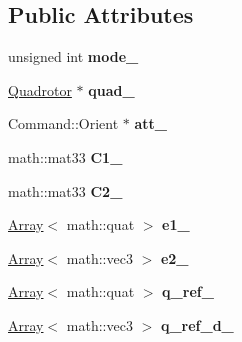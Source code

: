 \subsection*{Public Attributes}
\begin{DoxyCompactItemize}
\item 
\hypertarget{classAttitude_a0f341afa94379e3eb7619782d33e2690}{
unsigned int {\bfseries mode\_\-}}
\label{classAttitude_a0f341afa94379e3eb7619782d33e2690}

\item 
\hypertarget{classAttitude_a46e4a1fd13d48a7811ca925f8a33d7a3}{
\hyperlink{classQuadrotor}{Quadrotor} $\ast$ {\bfseries quad\_\-}}
\label{classAttitude_a46e4a1fd13d48a7811ca925f8a33d7a3}

\item 
\hypertarget{classAttitude_a902c2fc6c510aa1eca73c812854a4531}{
Command::Orient $\ast$ {\bfseries att\_\-}}
\label{classAttitude_a902c2fc6c510aa1eca73c812854a4531}

\item 
\hypertarget{classAttitude_a4551548f9b888cbc3f4a41d102fea01f}{
math::mat33 {\bfseries C1\_\-}}
\label{classAttitude_a4551548f9b888cbc3f4a41d102fea01f}

\item 
\hypertarget{classAttitude_a6e00c25cca6bf99d4828c96e22dd0f85}{
math::mat33 {\bfseries C2\_\-}}
\label{classAttitude_a6e00c25cca6bf99d4828c96e22dd0f85}

\item 
\hypertarget{classAttitude_a8117974c86248890c7c7ab6db5c73966}{
\hyperlink{classArray}{Array}$<$ math::quat $>$ {\bfseries e1\_\-}}
\label{classAttitude_a8117974c86248890c7c7ab6db5c73966}

\item 
\hypertarget{classAttitude_accfe50fd0abccd801da3708cd68e4896}{
\hyperlink{classArray}{Array}$<$ math::vec3 $>$ {\bfseries e2\_\-}}
\label{classAttitude_accfe50fd0abccd801da3708cd68e4896}

\item 
\hypertarget{classAttitude_aeec79b62c3e4e703e1f902bd989ee0ea}{
\hyperlink{classArray}{Array}$<$ math::quat $>$ {\bfseries q\_\-ref\_\-}}
\label{classAttitude_aeec79b62c3e4e703e1f902bd989ee0ea}

\item 
\hypertarget{classAttitude_a5d15fad5ac2ee69a8b1a306b33d7bcb8}{
\hyperlink{classArray}{Array}$<$ math::vec3 $>$ {\bfseries q\_\-ref\_\-d\_\-}}
\label{classAttitude_a5d15fad5ac2ee69a8b1a306b33d7bcb8}


\end{DoxyCompactItemize}
